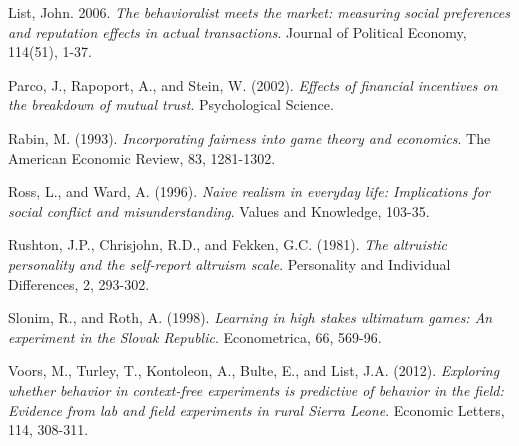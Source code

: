 \documentclass[12pt]{article}
\makeatletter
\let\oldappendix\appendix %
\renewcommand\appendix{%
    \oldappendix
    \newcommand{\section@cntformat}{\appendixname~\thesection\quad}
}
\makeatother
\begin{document}
{\begin{thebibliography}{9}
List, John. 2006.
\textit{The behavioralist meets the market: measuring social preferences and reputation effects in actual transactions}.
Journal of Political Economy, 114(51), 1-37.


Parco, J., Rapoport, A., and Stein, W. (2002).
\textit{Effects of financial incentives on the breakdown of mutual trust}.
Psychological Science.

Rabin, M. (1993).
\textit{Incorporating fairness into game theory and economics}.
The American Economic Review, 83, 1281-1302.

Ross, L., and Ward, A. (1996).
\textit{Naive realism in everyday life: Implications for social conflict and misunderstanding}.
Values and Knowledge, 103-35.

Rushton, J.P., Chrisjohn, R.D., and Fekken, G.C. (1981).
\textit{The altruistic personality and the self-report altruism scale}.
Personality and Individual Differences, 2, 293-302.

Slonim, R., and Roth, A. (1998).
\textit{Learning in high stakes ultimatum games: An experiment in the Slovak Republic}.
Econometrica, 66, 569-96.


Voors, M., Turley, T., Kontoleon, A., Bulte, E., and List, J.A. (2012).
\textit{Exploring whether behavior in context-free experiments is predictive of behavior in the field: Evidence from lab and field experiments in rural Sierra Leone}.
Economic Letters, 114, 308-311.


\end{thebibliography}

\newpage

\appendix
}
\end{document}
